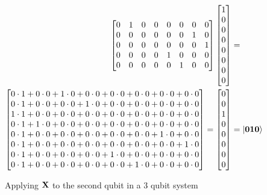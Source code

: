 \begin{figure}[H]
\begin{align*}
\begin{bmatrix}
            0 & 1 & 0 & 0 & 0 & 0 & 0 & 0\\
            0 & 0 & 0 & 0 & 0 & 0 & 1 & 0\\
            0 & 0 & 0 & 0 & 0 & 0 & 0 & 1\\
            0 & 0 & 0 & 0 & 1 & 0 & 0 & 0\\
            0 & 0 & 0 & 0 & 0 & 1 & 0 & 0\\
        \end{bmatrix}
        \begin{bmatrix}
            1\\
            0\\
            0\\
            0\\
            0\\
            0\\
            0\\
            0
        \end{bmatrix}
        &=\\
        \begin{bmatrix}
            0\cdot 1 + 0\cdot 0 + 1\cdot 0 + 0\cdot 0 + 0\cdot 0 + 0\cdot 0 + 0\cdot 0 + 0\cdot 0\\
            0\cdot 1 + 0\cdot 0 + 0\cdot 0 + 1\cdot 0 + 0\cdot 0 + 0\cdot 0 + 0\cdot 0 + 0\cdot 0\\
            1\cdot 1 + 0\cdot 0 + 0\cdot 0 + 0\cdot 0 + 0\cdot 0 + 0\cdot 0 + 0\cdot 0 + 0\cdot 0\\
            0\cdot 1 + 1\cdot 0 + 0\cdot 0 + 0\cdot 0 + 0\cdot 0 + 0\cdot 0 + 0\cdot 0 + 0\cdot 0\\
            0\cdot 1 + 0\cdot 0 + 0\cdot 0 + 0\cdot 0 + 0\cdot 0 + 0\cdot 0 + 1\cdot 0 + 0\cdot 0\\
            0\cdot 1 + 0\cdot 0 + 0\cdot 0 + 0\cdot 0 + 0\cdot 0 + 0\cdot 0 + 0\cdot 0 + 1\cdot 0\\
            0\cdot 1 + 0\cdot 0 + 0\cdot 0 + 0\cdot 0 + 1\cdot 0 + 0\cdot 0 + 0\cdot 0 + 0\cdot 0\\
            0\cdot 1 + 0\cdot 0 + 0\cdot 0 + 0\cdot 0 + 0\cdot 0 + 1\cdot 0 + 0\cdot 0 + 0\cdot 0\\
        \end{bmatrix}
        =
        \begin{bmatrix}
            0\\
            0\\
            1\\
            0\\
            0\\
            0\\
            0\\
            0
        \end{bmatrix}
        &=
        \ket{\mathbf{0}\mathbf{1}\mathbf{0}}\\
    \end{align*}
    \caption{Applying $\mathbf{X}$ to the second qubit in a 3 qubit system}
    \label{fig:individual_application2}
\end{figure}
